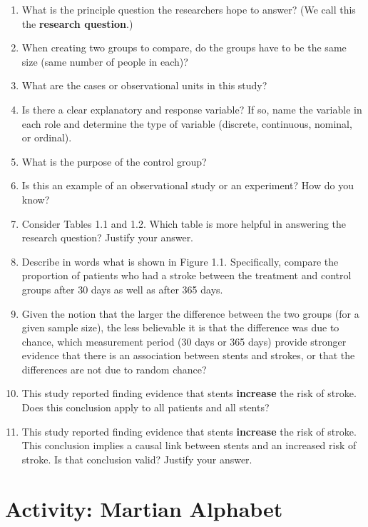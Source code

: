 \documentclass[
]{report}
\newcommand{\rgs}{\vspace{12pt}} %
\begin{document}
\begin{enumerate}
\def\labelenumi{\arabic{enumi}.}
\item
  What is the principle question the researchers hope to answer? (We call this the \textbf{research question}.)
  \rgs
  \rgs
\item
  When creating two groups to compare, do the groups have to be the same size (same number of people in each)?
  \rgs
  \rgs
\item
  What are the cases or observational units in this study?
  \rgs
  \rgs
\item
  Is there a clear explanatory and response variable? If so, name the variable in each role and determine the type of variable (discrete, continuous, nominal, or ordinal).
  \rgs
  \rgs
\item
  What is the purpose of the control group?
  \rgs
  \rgs
\item
  Is this an example of an observational study or an experiment? How do you know?
  \rgs
  \rgs
\item
  Consider Tables 1.1 and 1.2. Which table is more helpful in answering the research question? Justify your answer.
  \rgs
  \rgs
\item
  Describe in words what is shown in Figure 1.1. Specifically, compare the proportion of patients who had a stroke between the treatment and control groups after 30 days as well as after 365 days.
  \rgs
  \rgs
\item
  Given the notion that the larger the difference between the two groups (for a given sample size), the less believable it is that the difference was due to chance, which measurement period (30 days or 365 days) provide stronger evidence that there is an association between stents and strokes, or that the differences are not due to random chance?
  \rgs
  \rgs
\item
  This study reported finding evidence that stents \textbf{increase} the risk of stroke. Does this conclusion apply to all patients and all stents?
  \rgs
  \rgs
\item
  This study reported finding evidence that stents \textbf{increase} the risk of stroke. This conclusion implies a causal link between stents and an increased risk of stroke. Is that conclusion valid? Justify your answer.
\end{enumerate}

\newpage

\hypertarget{activity-martian-alphabet}{%
\section{Activity: Martian Alphabet}\label{activity-martian-alphabet}}
\end{document}
